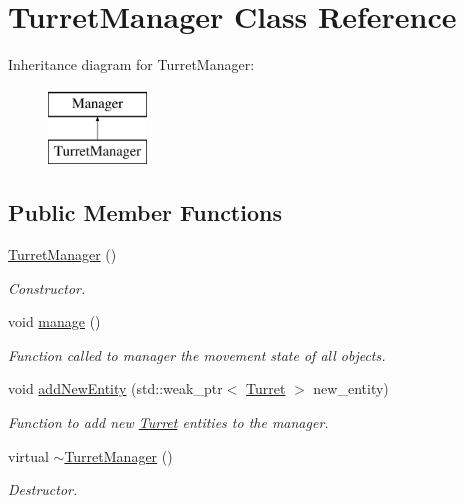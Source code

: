 \hypertarget{class_turret_manager}{\section{Turret\+Manager Class Reference}
\label{class_turret_manager}
}
Inheritance diagram for Turret\+Manager\+:\begin{figure}[H]
\begin{center}
\leavevmode
\includegraphics[height=2.000000cm]{class_turret_manager}
\end{center}
\end{figure}
\subsection*{Public Member Functions}
\begin{DoxyCompactItemize}
\item 
\hyperlink{class_turret_manager_a81d31a8afa69beed2e1e9ee92a148b62}{Turret\+Manager} ()
\begin{DoxyCompactList}\small\item\em Constructor. \end{DoxyCompactList}\item 
\hypertarget{class_turret_manager_a3339500bc4e12ed437681876ca702bd3}{void \hyperlink{class_turret_manager_a3339500bc4e12ed437681876ca702bd3}{manage} ()}\label{class_turret_manager_a3339500bc4e12ed437681876ca702bd3}

\begin{DoxyCompactList}\small\item\em Function called to manager the movement state of all objects. \end{DoxyCompactList}\item 
\hypertarget{class_turret_manager_a61a5c5fe1961ca9483271da3aeac0489}{void \hyperlink{class_turret_manager_a61a5c5fe1961ca9483271da3aeac0489}{add\+New\+Entity} (std\+::weak\+\_\+ptr$<$ \hyperlink{class_turret}{Turret} $>$ new\+\_\+entity)}\label{class_turret_manager_a61a5c5fe1961ca9483271da3aeac0489}

\begin{DoxyCompactList}\small\item\em Function to add new \hyperlink{class_turret}{Turret} entities to the manager. \end{DoxyCompactList}\item 
\hypertarget{class_turret_manager_a223f756a6c40df2487a0b98b640c3155}{virtual \hyperlink{class_turret_manager_a223f756a6c40df2487a0b98b640c3155}{$\sim$\+Turret\+Manager} ()}\label{class_turret_manager_a223f756a6c40df2487a0b98b640c3155}

\begin{DoxyCompactList}\small\item\em Destructor. \end{DoxyCompactList}\end{DoxyCompactItemize}


